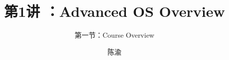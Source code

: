 


\title[第1讲]{第1讲 ：Advanced OS Overview} %
\subtitle{第一节：Course Overview }
\author{陈渝} %
\date{}



\begin{frame}
\titlepage %
\end{frame}

